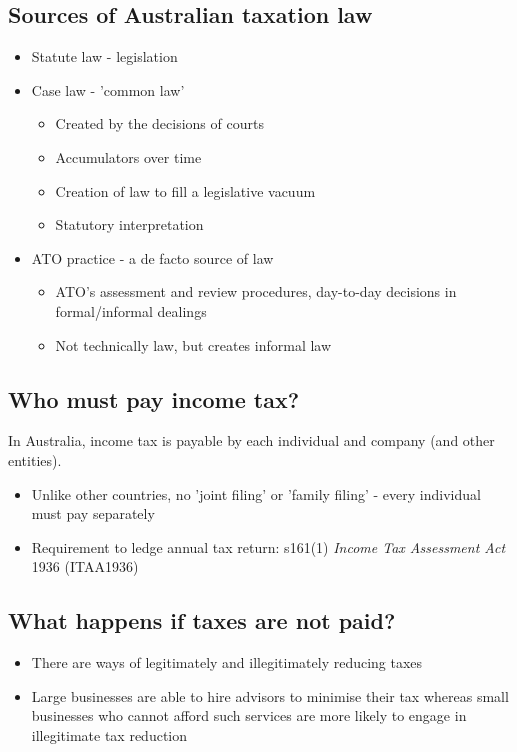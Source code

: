 \documentclass{article}
\begin{document}
	\subsection{Sources of Australian taxation law}

		\begin{itemize}
			\item Statute law - legislation
			\item Case law - 'common law'
				\begin{itemize}
					\item Created by the decisions of courts
					\item Accumulators over time
					\item Creation of law to fill a legislative vacuum
					\item Statutory interpretation
				\end{itemize}
			\item ATO practice - a de facto source of law
				\begin{itemize}
					\item ATO's assessment and review procedures, day-to-day decisions in formal/informal dealings
					\item Not technically law, but creates informal law
				\end{itemize}
		\end{itemize}
		
	\subsection{Who must pay income tax?}

		In Australia, income tax is payable by each individual and company (and other entities).
		\begin{itemize}
			\item Unlike other countries, no 'joint filing' or 'family filing' - every individual must pay separately
			\item Requirement to ledge annual tax return: s161(1) \textit{Income Tax Assessment Act} 1936 (ITAA1936)
		\end{itemize}

	\subsection{What happens if taxes are not paid?}

		\begin{itemize}
			\item There are ways of legitimately and illegitimately reducing taxes
			\item Large businesses are able to hire advisors to minimise their tax whereas small businesses who cannot afford such services are more likely to engage in illegitimate tax reduction
		\end{itemize}
\end{document}
